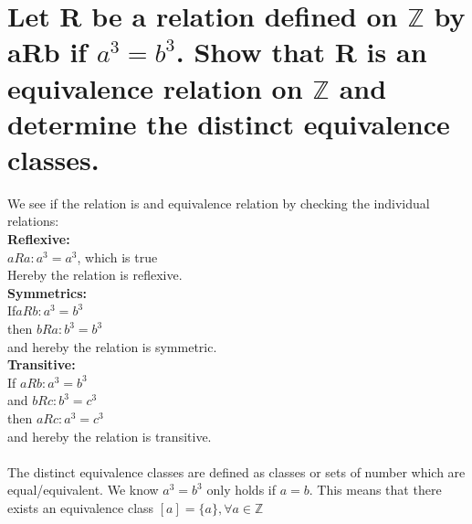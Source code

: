 \section{Let R be a relation defined on $\mathbb{Z}$ by aRb if $a^3 = b^3$. Show that R is an equivalence relation on $\mathbb{Z}$ and determine the distinct equivalence classes.}
We see if the relation is and equivalence relation by checking the individual relations:\\
\textbf{Reflexive:}\\
$aRa: a^3=a^3$, which is true\\ 
Hereby the relation is reflexive.\\
\textbf{Symmetrics:}\\
If$aRb: a^3=b^3$\\
then $bRa: b^3=b^3$\\
and hereby the relation is symmetric.\\
\textbf{Transitive:}\\
If $aRb: a^3=b^3$\\
and $bRc: b^3=c^3$\\
then $aRc: a^3=c^3$\\
and hereby the relation is transitive.\\
\\
The distinct equivalence classes are defined as classes or sets of number which are equal/equivalent. We know $a^3=b^3$ only holds if $a=b$. This means that there exists an equivalence class $[a]=\{a\},  \forall a \in \mathbb{Z}$

\newpage
